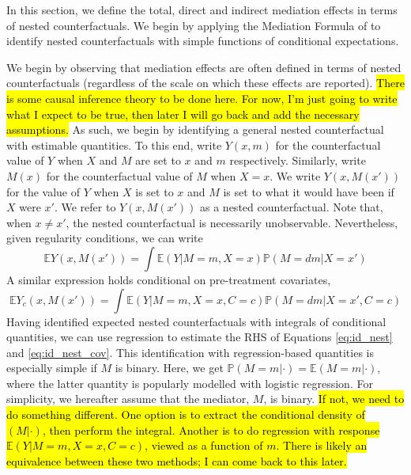 \documentclass{article}
\newcommand{\bP}{\mathbb{P}}
\newcommand{\bE}{\mathbb{E}}
\begin{document}
In this section, we define the total, direct and indirect mediation effects in terms of nested counterfactuals. We begin by applying the Mediation Formula of \citet{Pea12} to identify nested counterfactuals with simple functions of conditional expectations.

We begin by observing that mediation effects are often defined in terms of nested counterfactuals (regardless of the scale on which these effects are reported). \hl{There is some causal inference theory to be done here. For now, I'm just going to write what I expect to be true, then later I will go back and add the necessary assumptions.} As such, we begin by identifying a general nested counterfactual with estimable quantities. To this end, write $Y(x, m)$ for the counterfactual value of $Y$ when $X$ and $M$ are set to $x$ and $m$ respectively. Similarly, write $M(x)$ for the counterfactual value of $M$ when $X=x$. We write $Y(x, M(x'))$ for the value of $Y$ when $X$ is set to $x$ and $M$ is set to what it would have been if $X$ were $x'$. We refer to $Y(x, M(x'))$ as a nested counterfactual. Note that, when $x \neq x'$, the nested counterfactual is necessarily unobservable. Nevertheless, given regularity conditions, we can write
%
\begin{equation}
    \bE Y(x, M(x')) = \int \bE(Y | M=m, X=x) \bP(M = dm | X = x') \label{eq:id_nest}
\end{equation}
%
A similar expression holds conditional on pre-treatment covariates,
\begin{equation}
    \bE Y_c(x, M(x')) = \int \bE(Y | M=m, X=x, C=c) \bP(M = dm | X = x', C=c) \label{eq:id_nest_cov}
\end{equation}
%
Having identified expected nested counterfactuals with integrals of conditional quantities, we can use regression to estimate the RHS of Equations \ref{eq:id_nest} and \ref{eq:id_nest_cov}. This identification with regression-based quantities is especially simple if $M$ is binary. Here, we get $\bP(M=m | \cdot) = \bE(M=m | \cdot)$, where the latter quantity is popularly modelled with logistic regression. For simplicity, we hereafter assume that the mediator, $M$, is binary. \hl{If not, we need to do something different. One option is to extract the conditional density of $(M | \cdot)$, then perform the integral. Another is to do regression with response $\bE(Y | M=m, X=x, C=c)$, viewed as a function of $m$. There is likely an equivalence between these two methods; I can come back to this later.}
\end{document}

